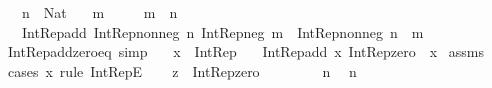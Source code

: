 \begin{isabellebody}
\ \ \ {\isachardoublequoteopen}n\ {\isacharcolon}{\kern0pt}\ Nat{\isachardoublequoteclose}\isanewline
\ \ \ {\isachardoublequoteopen}m\ {\isasymnoteq}\ {}{\isachardoublequoteclose}\isanewline
\ \ \ {\isachardoublequoteopen}m\ {\isasymle}\ n{\isachardoublequoteclose}\isanewline
\ \ \ {\isachardoublequoteopen}Int{\isacharunderscore}{\kern0pt}Rep{\isacharunderscore}{\kern0pt}add\ {\isacharparenleft}{\kern0pt}Int{\isacharunderscore}{\kern0pt}Rep{\isacharunderscore}{\kern0pt}nonneg\ n{\isacharparenright}{\kern0pt}\ {\isacharparenleft}{\kern0pt}Int{\isacharunderscore}{\kern0pt}Rep{\isacharunderscore}{\kern0pt}neg\ m{\isacharparenright}{\kern0pt}\ {\isacharequal}{\kern0pt}\ Int{\isacharunderscore}{\kern0pt}Rep{\isacharunderscore}{\kern0pt}nonneg\ {\isacharparenleft}{\kern0pt}n\ {\isacharminus}{\kern0pt}\ m{\isacharparenright}{\kern0pt}{\isachardoublequoteclose}\isanewline
\ \ \isanewline
%
\isadelimproof
%
\endisadelimproof
%
\isatagproof
{}\isamarkupfalse%
%
\endisatagproof
{\isafoldproof}%
%
\isadelimproof
\isanewline
%
\endisadelimproof
\isanewline
{}\isamarkupfalse%
\ Int{\isacharunderscore}{\kern0pt}Rep{\isacharunderscore}{\kern0pt}add{\isacharunderscore}{\kern0pt}zero{\isacharunderscore}{\kern0pt}eq\ {\isacharbrackleft}{\kern0pt}simp{\isacharbrackright}{\kern0pt}{\isacharcolon}{\kern0pt}\isanewline
\ \ \ {\isachardoublequoteopen}x\ {\isacharcolon}{\kern0pt}\ Int{\isacharunderscore}{\kern0pt}Rep{\isachardoublequoteclose}\isanewline
\ \ \ {\isachardoublequoteopen}Int{\isacharunderscore}{\kern0pt}Rep{\isacharunderscore}{\kern0pt}add\ x\ Int{\isacharunderscore}{\kern0pt}Rep{\isacharunderscore}{\kern0pt}zero\ {\isacharequal}{\kern0pt}\ x{\isachardoublequoteclose}\isanewline
%
\isadelimproof
%
\endisadelimproof
%
\isatagproof
{}\isamarkupfalse%
\ assms\isanewline
{}\isamarkupfalse%
\ {\isacharparenleft}{\kern0pt}cases\ x\ rule{\isacharcolon}{\kern0pt}\ Int{\isacharunderscore}{\kern0pt}RepE{\isacharparenright}{\kern0pt}\isanewline
\ \ \isamarkupfalse%
\ {\isacharquery}{\kern0pt}z\ {\isacharequal}{\kern0pt}\ Int{\isacharunderscore}{\kern0pt}Rep{\isacharunderscore}{\kern0pt}zero\isanewline
\ \ \isacommand{{\isacharbraceleft}{\kern0pt}}\isamarkupfalse%
\isanewline
\ \ \ \ \isamarkupfalse%
\ n\ \isamarkupfalse%
\ {\isachardoublequoteopen}n\ {\isasymin}\ {\isasymnat}{\isachardoublequoteclose}\isanewline
\ \ \ \ \isamarkupfalse%

\end{isabellebody}
